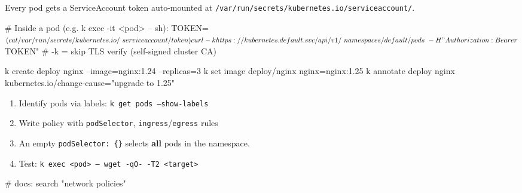 \begin{tcbitemize}[
  raster columns=3, raster equal height=rows,
  blanker, cheat subtitle
]
\begin{tcbitemize}[
      raster columns=1, raster equal height=rows,
      blanker, cheat subtitle
    ]
      \tcbitem
          {\fontsize{6.5}{7.5}\selectfont\sffamily
          Every pod gets a ServiceAccount token auto-mounted at \texttt{/var/run/secrets/kubernetes.io/serviceaccount/}.}
          \begin{cheatcodebash}
          # Inside a pod (e.g. k exec -it <pod> -- sh):
          TOKEN=$(cat /var/run/secrets/kubernetes.io/\
          serviceaccount/token)
          curl -k https://kubernetes.default.svc/api/v1/\
          namespaces/default/pods \
            -H "Authorization: Bearer $TOKEN"
          # -k = skip TLS verify (self-signed cluster CA)
          \end{cheatcodebash}

      \tcbitem
          \begin{cheatcodebash}
          k create deploy nginx --image=nginx:1.24 --replicas=3
          k set image deploy/nginx nginx=nginx:1.25
          k annotate deploy nginx kubernetes.io/change-cause="upgrade to 1.25"
          \end{cheatcodebash}

      \tcbitem
          {\fontsize{6.5}{7.5}\selectfont\sffamily
          \begin{enumerate}[leftmargin=1.2em, itemsep=0pt, parsep=0pt, topsep=1pt]
            \item Identify pods via labels: \texttt{k get pods --show-labels}
            \item Write policy with \texttt{podSelector}, \texttt{ingress}/\texttt{egress} rules
            \item \emoji{warning}  An empty \texttt{podSelector: \{\}} selects \textbf{all} pods in the namespace.
            \item Test: \texttt{k exec <pod> -- wget -qO- -T2 <target>}
          \end{enumerate}}
          \begin{cheatcodebash}
          # docs: search "network policies"
          \end{cheatcodebash}


\end{tcbitemize}
\end{tcbitemize}
